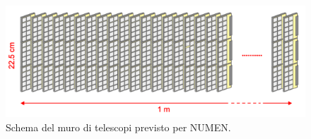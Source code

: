 \begin{figure} [!t]
	\centering
	\includegraphics[width=\textwidth, keepaspectratio]{Grafici/muro_telescopi.png}
	\caption{Schema del muro di telescopi previsto per NUMEN.} \label{fig:muro_telescopi}
\end{figure}











\subsection{}



